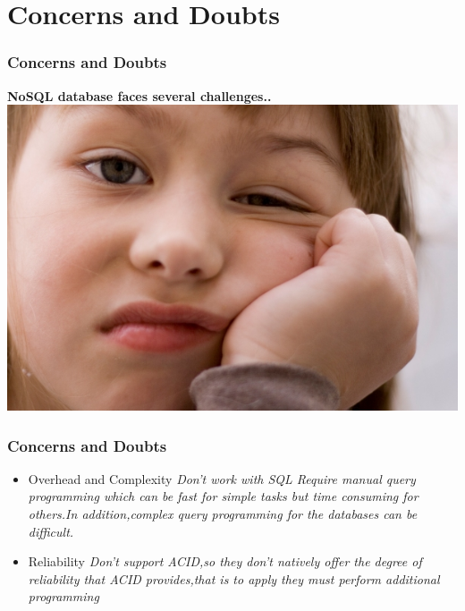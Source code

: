 \documentclass{beamer}
\begin{document}
\section[]{Concerns and Doubts}
\begin{frame}\frametitle{Concerns and Doubts}
\textbf{NoSQL database faces several challenges..}\newline\newline
\includegraphics[scale=1]{bored-girl.jpg}
\end{frame}
\begin{frame}\frametitle{Concerns and Doubts}
\vspace{0.5cm}
\begin{itemize}
\item Overhead and Complexity
\newline 
\textit{Don't work with SQL \newline Require manual query programming which can be fast for simple tasks but time consuming for others.\newline In addition,complex query programming for the databases can be difficult.}
\newline
\item Reliability \newline
\textit{ Don't support ACID,so they don't natively offer the degree of reliability that ACID provides,that is to apply they must perform additional programming}
\newline \vspace{0.5cm}
\end{itemize}
\end{frame}
\end{document}
